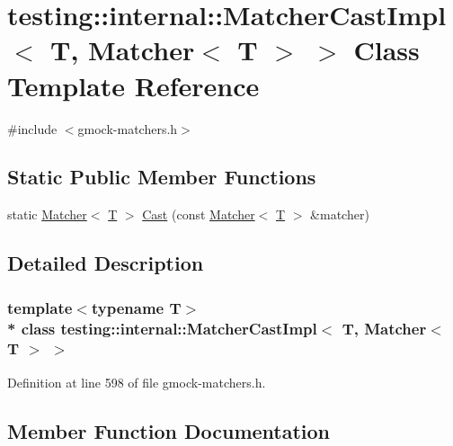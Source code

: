 \hypertarget{classtesting_1_1internal_1_1_matcher_cast_impl_3_01_t_00_01_matcher_3_01_t_01_4_01_4}{}\section{testing\+:\+:internal\+:\+:Matcher\+Cast\+Impl$<$ T, Matcher$<$ T $>$ $>$ Class Template Reference}
\label{classtesting_1_1internal_1_1_matcher_cast_impl_3_01_t_00_01_matcher_3_01_t_01_4_01_4}


{\ttfamily \#include $<$gmock-\/matchers.\+h$>$}

\subsection*{Static Public Member Functions}
\begin{DoxyCompactItemize}
\item 
static \hyperlink{classtesting_1_1_matcher}{Matcher}$<$ \hyperlink{functions__7_8js_adf1f3edb9115acb0a1e04209b7a9937b}{T} $>$ \hyperlink{classtesting_1_1internal_1_1_matcher_cast_impl_3_01_t_00_01_matcher_3_01_t_01_4_01_4_ac945132186fcbe0e0d2d8c207d730026}{Cast} (const \hyperlink{classtesting_1_1_matcher}{Matcher}$<$ \hyperlink{functions__7_8js_adf1f3edb9115acb0a1e04209b7a9937b}{T} $>$ \&matcher)
\end{DoxyCompactItemize}


\subsection{Detailed Description}
\subsubsection*{template$<$typename T$>$\\*
class testing\+::internal\+::\+Matcher\+Cast\+Impl$<$ T, Matcher$<$ T $>$ $>$}



Definition at line 598 of file gmock-\/matchers.\+h.



\subsection{Member Function Documentation}
